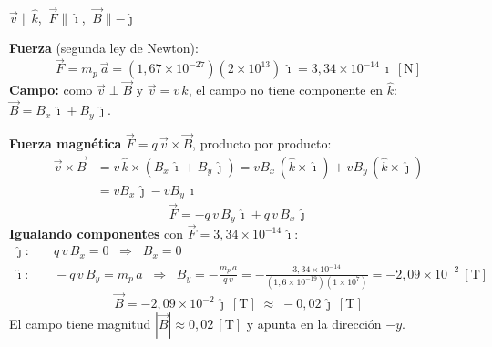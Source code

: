 \documentclass[12pt,letterpaper]{article}
\begin{document}
\medskip
\noindent
\begin{minipage}[t]{0.36\textwidth}
\centering\vspace{0pt}
\\[2pt]
{\footnotesize $\vec{v}\parallel\hat{k}$, $\ \vec{F}\parallel\hat{\imath}$, $\ \vec{B}\parallel-\hat{\jmath}$}
\end{minipage}%
\hfill
\begin{minipage}[t]{0.60\textwidth}
\vspace{2pt}
\textbf{Fuerza} (segunda ley de Newton):
\[
    \vec{F} = m_p\,\vec{a} = (1{,}67\times10^{-27})(2\times10^{13})\,\hat{\imath}
            = 3{,}34\times10^{-14}\,\hat{\imath}\ [\text{N}]
\]
\textbf{Campo:} como $\vec{v}\perp\vec{B}$ y $\vec{v}=v\,\hat{k}$, el campo no tiene componente en
$\hat{k}$: \ $\vec{B} = B_x\,\hat{\imath} + B_y\,\hat{\jmath}$.
\end{minipage}

\medskip
\noindent\textbf{Fuerza magn\'etica} $\vec{F} = q\,\vec{v}\times\vec{B}$, producto por producto:
\begin{align*}
    \vec{v}\times\vec{B} &= v\,\hat{k}\times\left(B_x\,\hat{\imath} + B_y\,\hat{\jmath}\right)
                          = v B_x\,(\hat{k}\times\hat{\imath}) + v B_y\,(\hat{k}\times\hat{\jmath})\\[2pt]
                         &= v B_x\,\hat{\jmath} - v B_y\,\hat{\imath}
\end{align*}
\[
    \vec{F} = -q\,v\,B_y\,\hat{\imath} + q\,v\,B_x\,\hat{\jmath}
\]
\textbf{Igualando componentes} con $\vec{F} = 3{,}34\times10^{-14}\,\hat{\imath}$:
\begin{align*}
    \hat{\jmath}:&\quad q\,v\,B_x = 0 \;\;\Rightarrow\;\; B_x = 0\\[2pt]
    \hat{\imath}:&\quad -q\,v\,B_y = m_p\,a \;\;\Rightarrow\;\;
        B_y = -\frac{m_p\,a}{q\,v} = -\frac{3{,}34\times10^{-14}}{(1{,}6\times10^{-19})(1\times10^{7})}
        = -2{,}09\times10^{-2}\ [\text{T}]
\end{align*}
\[
    \boxed{\vec{B} = -2{,}09\times10^{-2}\,\hat{\jmath}\ [\text{T}] \;\approx\; -0{,}02\,\hat{\jmath}\ [\text{T}]}
\]
El campo tiene magnitud $|\vec{B}| \approx 0{,}02\ [\text{T}]$ y apunta en la direcci\'on $-y$.
\end{document}

